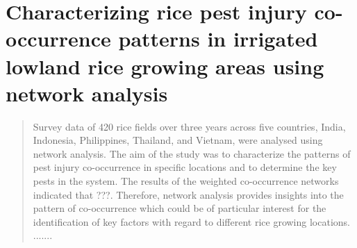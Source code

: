 \section{Characterizing rice pest injury co-occurrence patterns in irrigated lowland rice growing areas using network analysis}


\begin{abstract}
Survey data of 420 rice fields over three years across five countries, India, Indonesia, Philippines, Thailand, and Vietnam, were analysed using network analysis. The aim of the study was to characterize the patterns of pest injury co-occurrence in specific locations and to determine the key pests in the system. The results of the weighted co-occurrence networks indicated that ???. Therefore, network analysis provides insights into the pattern of co-occurrence  which could be of particular interest for the identification of key factors with regard to different rice growing locations. .......
\end{abstract}